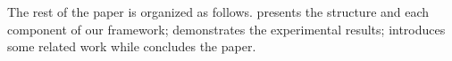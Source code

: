
%
%
%

The rest of the paper is organized as follows.
 presents the structure and each component of our
framework;
 demonstrates the experimental results;
 introduces some related work while
 concludes the paper.

